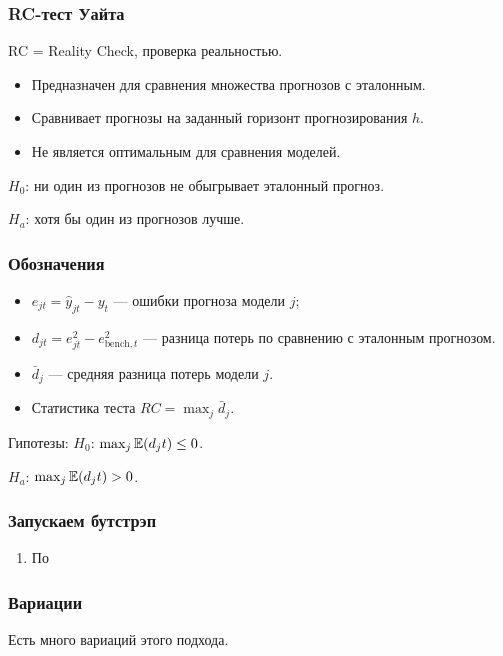 \begin{frame}
    \frametitle{RC-тест Уайта}

    RC = Reality Check, проверка реальностью. 
    \pause 

    \begin{itemize}
        \item Предназначен для сравнения \alert{множества} прогнозов с эталонным. \pause
        \item Сравнивает прогнозы на \alert{заданный горизонт} прогнозирования $h$. \pause
        \item Не является оптимальным для \alert{сравнения моделей}. \pause
      \end{itemize}

      $H_0$: ни один из прогнозов не обыгрывает эталонный прогноз. 

      $H_a$: хотя бы один из прогнозов лучше. 
\end{frame}

\begin{frame}
    \frametitle{Обозначения}
    
    \begin{itemize}
        \item $e_{jt} = \hat y_{jt} - y_t$ — ошибки прогноза модели $j$; \pause
        \item $d_{jt} = e_{jt}^2 - e_{\text{bench}, t}^2$ — разница потерь по сравнению с эталонным прогнозом. \pause
        \item $\bar d_j$ — средняя разница потерь модели $j$. \pause
        \item Статистика теста $RC = \max_j \bar d_j$.  
    \end{itemize}    
    \pause 
    Гипотезы:
    $H_0$: $\max_j \mathbb{E}(d_jt) \leq 0$. 

    $H_a$: $\max_j \mathbb{E}(d_jt) > 0$.
\end{frame}

\begin{frame}
    \frametitle{Запускаем бутстрэп}

    \begin{enumerate}
        \item По 
    \end{enumerate}
    

\end{frame}


\begin{frame}
    \frametitle{Вариации}

    Есть \alert{много} вариаций этого подхода. 


    

\end{frame}




